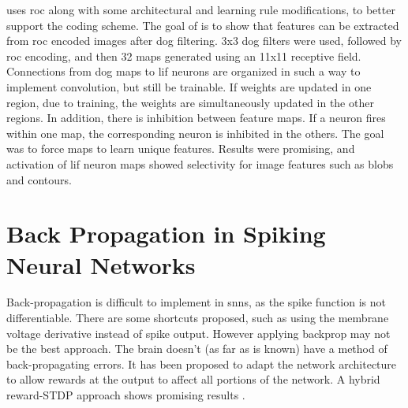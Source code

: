     \parencite{delorme_2001} uses \gls{roc} along with some architectural and learning rule
    modifications, to better support the coding scheme. The goal of \parencite{delorme_2001}
    is to show that features can be extracted from \gls{roc} encoded images after \gls{dog}
    filtering. 3x3 \gls{dog} filters were used, followed by \gls{roc} encoding, and then 32
    maps generated using an 11x11 receptive field. Connections from \Gls{dog} maps to
    \gls{lif} neurons are organized in such a way to implement convolution, but still
    be trainable. If weights are updated in one region, due to training, the
    weights are simultaneously updated in the other regions. In addition, there
    is inhibition between feature maps. If a neuron fires within one map, the
    corresponding neuron is inhibited in the others. The goal was to force maps
    to learn unique features. Results were promising, and activation of \Gls{lif}
    neuron maps showed selectivity for image features such as blobs and
    contours.
    
    \section{Back Propagation in Spiking Neural Networks}
    
    Back-propagation is difficult to implement in \Glspl{snn}, as the
    spike function is not differentiable. There are some shortcuts proposed,
    such as using the membrane voltage derivative instead of spike
    output. However applying backprop may not be the best approach. The brain
    doesn't (as far as is known) have a method of back-propagating errors. It
    has been proposed to adapt the network architecture to allow rewards at the
    output to affect all portions of the network. A hybrid reward-STDP approach
    shows promising results \parencite{tavanaei_2019}.
    
    
